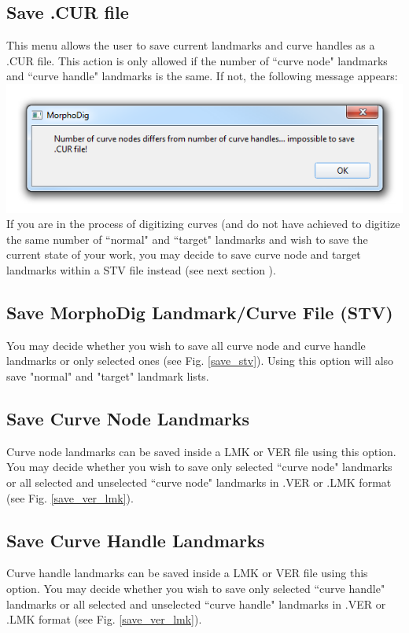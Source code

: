 \subsection{Save .CUR file}
This menu allows the user to save current landmarks and curve handles as a .CUR file. This action is only allowed if the number of ``curve node" landmarks and ``curve handle" landmarks is the same. If not, the following message appears:\\
\includegraphics[scale=0.5]{images/07/curves/nnodes_nhandles_differ.png}
\\
If you are in the process of digitizing curves (and do not have achieved to digitize the same number of ``normal" and ``target"  landmarks and wish to save the current state of your work, you may decide to save curve node and target landmarks within a STV file instead (see next section ).
\subsection{Save MorphoDig Landmark/Curve File (STV)}
You may decide whether you wish to save all curve node and curve handle landmarks or only selected ones (see Fig. \ref{save_stv}). Using this option will also save "normal" and "target" landmark lists.
\subsection{Save Curve Node Landmarks}
Curve node landmarks can be saved inside a LMK or VER file using this option. You may decide whether you wish to save only selected ``curve node" landmarks or all selected and unselected ``curve node" landmarks in .VER or .LMK format (see Fig. \ref{save_ver_lmk}).

\subsection{Save Curve Handle Landmarks}
Curve handle landmarks can be saved inside a LMK or VER file using this option. You may decide whether you wish to save only selected ``curve handle" landmarks or all selected and unselected ``curve handle" landmarks in .VER or .LMK format (see Fig. \ref{save_ver_lmk}).


